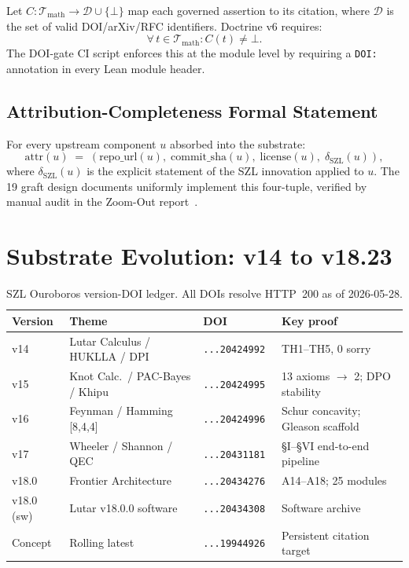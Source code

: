 Let \(C : \mathcal{T}_{\text{math}} \to \mathcal{D} \cup \{\bot\}\) map
each governed assertion to its citation, where \(\mathcal{D}\) is the set
of valid DOI/arXiv/RFC identifiers.
Doctrine v6 requires:
\[
  \forall\, t \in \mathcal{T}_{\text{math}} : C(t) \neq \bot.
\]
The DOI-gate CI script enforces this at the module level by requiring a
\texttt{DOI:} annotation in every Lean module header.

\subsection{Attribution-Completeness Formal Statement}

For every upstream component \(u\) absorbed into the substrate:
\[
  \text{attr}(u) \;=\;
  (\text{repo\_url}(u),\; \text{commit\_sha}(u),\;
   \text{license}(u),\; \delta_{\mathrm{SZL}}(u)),
\]
where \(\delta_{\mathrm{SZL}}(u)\) is the explicit statement of the SZL
innovation applied to \(u\).
The 19 graft design documents uniformly implement this four-tuple,
verified by manual audit in the Zoom-Out report~\cite{lutar2026v18}.


\section{Substrate Evolution: v14 to v18.23}
\label{sec:evolution}

\begin{table}[ht]
\centering
\caption{SZL Ouroboros version-DOI ledger.  All DOIs resolve HTTP~200
  as of 2026-05-28.}
\label{tab:versiontable}
\small
\begin{tabular}{lp{5.2cm}ll}
\hline
\textbf{Version} & \textbf{Theme} & \textbf{DOI} & \textbf{Key proof} \\
\hline
v14 & Lutar Calculus / HUKLLA / DPI
  & \texttt{...20424992}~\cite{lutar2026v14}
  & TH1--TH5, 0 sorry \\
v15 & Knot Calc.\ / PAC-Bayes / Khipu
  & \texttt{...20424995}~\cite{lutar2026v15}
  & 13 axioms \(\to\) 2; DPO stability \\
v16 & Feynman / Hamming [8,4,4]
  & \texttt{...20424996}~\cite{lutar2026v16}
  & Schur concavity; Gleason scaffold \\
v17 & Wheeler / Shannon / QEC
  & \texttt{...20431181}~\cite{lutar2026v17}
  & \S{}I--\S{}VI end-to-end pipeline \\
v18.0 & Frontier Architecture
  & \texttt{...20434276}~\cite{lutar2026v18}
  & A14--A18; 25 modules \\
v18.0 (sw) & Lutar v18.0.0 software
  & \texttt{...20434308}~\cite{lutar2026software}
  & Software archive \\
Concept & Rolling latest
  & \texttt{...19944926}~\cite{lutar2026concept}
  & Persistent citation target \\
\hline
\end{tabular}
\end{table}

